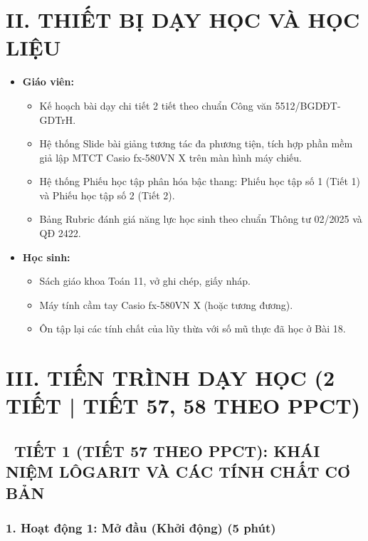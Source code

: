 \documentclass[12pt, a4paper]{article}
\begin{document}
\vspace{5pt}

\section*{II. THIẾT BỊ DẠY HỌC VÀ HỌC LIỆU}

\begin{itemize}[leftmargin=1.2cm]
    \item \textbf{Giáo viên:}
    \begin{itemize}[leftmargin=0.6cm]
        \item Kế hoạch bài dạy chi tiết 2 tiết theo chuẩn Công văn 5512/BGDĐT-GDTrH.
        \item Hệ thống Slide bài giảng tương tác đa phương tiện, tích hợp phần mềm giả lập MTCT Casio fx-580VN X trên màn hình máy chiếu.
        \item Hệ thống Phiếu học tập phân hóa bậc thang: Phiếu học tập số 1 (Tiết 1) và Phiếu học tập số 2 (Tiết 2).
        \item Bảng Rubric đánh giá năng lực học sinh theo chuẩn Thông tư 02/2025 và QĐ 2422.
    \end{itemize}
    \item \textbf{Học sinh:}
    \begin{itemize}[leftmargin=0.6cm]
        \item Sách giáo khoa Toán 11, vở ghi chép, giấy nháp.
        \item Máy tính cầm tay Casio fx-580VN X (hoặc tương đương).
        \item Ôn tập lại các tính chất của lũy thừa với số mũ thực đã học ở Bài 18.
    \end{itemize}
\end{itemize}

\vspace{5pt}

\section*{III. TIẾN TRÌNH DẠY HỌC (2 TIẾT | TIẾT 57, 58 THEO PPCT)}

\subsection*{\faClockO \ TIẾT 1 (TIẾT 57 THEO PPCT): KHÁI NIỆM LÔGARIT VÀ CÁC TÍNH CHẤT CƠ BẢN}

\subsubsection*{1. Hoạt động 1: Mở đầu (Khởi động) (5 phút)}
\end{document}
